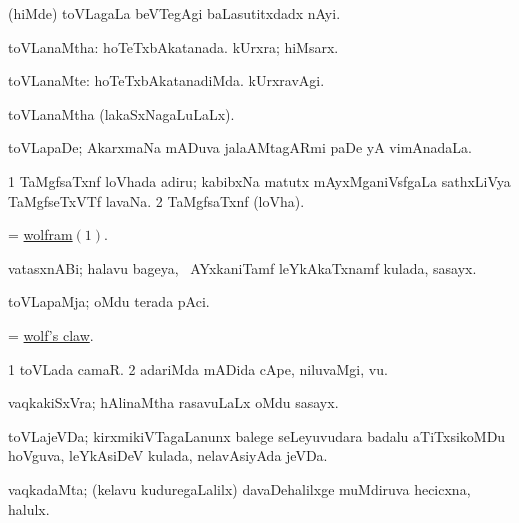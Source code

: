 \bentry
{} 
\gl{\nA}
\expl{}
\bmng
(hiMde) toVLagaLa beVTegAgi baLasutitxdadx nAyi. 
\emng
\eentry

\bentry
{} 
\gl{\gu}
\expl{}
\bmng
toVLanaMtha: 
\banum
{} hoTeTxbAkatanada. 
 kUrxra; hiMsarx. 
\eanum
\emng
\eentry

\bentry
{} 
\gl{\kirxvi}
\expl{}
\bmng
toVLanaMte: 
\banum
{} hoTeTxbAkatanadiMda. 
 kUrxravAgi. 
\eanum
\emng
\eentry

\bentry
{} 
\gl{\gu}
\expl{}
\bmng
toVLanaMtha (lakaSxNagaLuLaLx). 
\emng
\eentry

\bentry
{} 
\gl{\nA}
\expl{}
\bmng
toVLapaDe; AkarxmaNa mADuva jalaAMtagARmi paDe yA vimAnadaLa. 
\emng
\eentry

\bentry
{} 
\gl{\nA}
\expl{}
\bmng
\bnum
\num{1} TaMgfsaTxnf loVhada adiru; kabibxNa matutx mAyxMganiVsfgaLa sathxLiVya TaMgfseTxVTf lavaNa. 
\num{2} TaMgfsaTxnf (loVha). 
\enum
\emng
\eentry

\bentry 
{} 
\gl{\nA}
\expl{}
\bmng
= \hyperlink{wolfram}{wolfram\((1)\)}. 
\emng
\eentry

\bentry
{} 
\gl{\nA}
\bmng
vatasxnABi; halavu bageya, \kanmu\ AYxkaniTamf leYkAkaTxnamf kulada, sasayx. 
\emng
\eentry

\bentry
{} 
\gl{\nA}
\expl{}
\bmng
toVLapaMja; oMdu terada pAci. 
\emng
\eentry

\bentry
{} 
\gl{\nA}
\expl{}
\bmng
= \hyperlink{wolf's claw}{wolf's claw}. 
\emng
\eentry

\bentry
{} 
\gl{\nA}
\expl{}
\bmng
\bnum
\num{1} toVLada camaR. 
\num{2} adariMda mADida cApe, niluvaMgi, \mo vu. 
\enum
\emng
\eentry

\bentry
{} 
\gl{\nA}
\expl{}
\bmng
vaqkakiSxVra; hAlinaMtha rasavuLaLx oMdu sasayx. 
\emng
\eentry

\bentry
{} 
\gl{\nA}
\expl{}
\bmng
toVLajeVDa; kirxmikiVTagaLanunx balege seLeyuvudara badalu aTiTxsikoMDu hoVguva, leYkAsiDeV kulada, nelavAsiyAda jeVDa. 
\emng
\eentry

\bentry
{} 
\gl{\nA}
\expl{}
\bmng
vaqkadaMta; (kelavu kuduregaLalilx) davaDehalilxge muMdiruva hecicxna, halulx. 
\emng
\eentry

